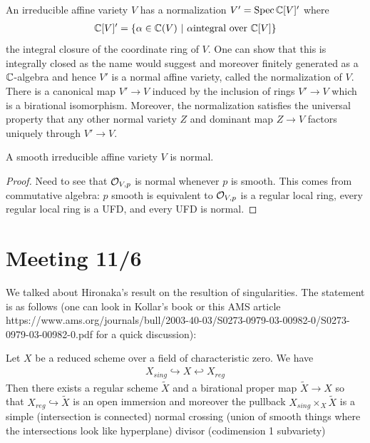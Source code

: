 \documentclass[12pt]{article}
\begin{document}
\begin{fact}
    An irreducible affine variety $V$ has a normalization $V' = \operatorname{Spec}\mathbb{C}[V]'$ where \begin{align*}
        \mathbb{C}[V]' = \{\alpha\in\mathbb{C}(V)\ \vert \ \alpha \text{integral over $\mathbb{C}[V]$}\}
    \end{align*} the integral closure of the coordinate ring of $V$. One can show that this is integrally closed as the name would suggest and moreover finitely generated as a $\mathbb{C}$-algebra and hence $V'$ is a normal affine variety, called the normalization of $V$. There is a canonical map $V'\to V$ induced by the inclusion of rings $V'\to V$ which is a birational isomorphism. Moreover, the normalization satisfies the universal property that any other normal variety $Z$ and dominant map $Z\to V$ factors uniquely through $V'\to V$.
\end{fact}

\begin{proposition}
    A smooth irreducible affine variety $V$ is normal.
\end{proposition}
\begin{proof}
    Need to see that $\mathcal{O}_{V,p}$ is normal whenever $p$ is smooth. This comes from commutative algebra: $p$ smooth is equivalent to $\mathcal{O}_{V,p}$ is a regular local ring, every regular local ring is a UFD, and every UFD is normal.  
\end{proof}

\section{Meeting 11/6}
We talked about Hironaka's result on the resultion of singularities. The statement is as follows (one can look in Kollar's book or this AMS article https://www.ams.org/journals/bull/2003-40-03/S0273-0979-03-00982-0/S0273-0979-03-00982-0.pdf for a quick discussion): 

\begin{theorem}
    Let $X$ be a reduced scheme over a field of characteristic zero. We have \begin{align*}
        X_{sing}\hookrightarrow X \hookleftarrow X_{reg}
    \end{align*} Then there exists a regular scheme $\tilde{X}$ and a birational proper map $\tilde{X}\to X$ so that $X_{reg}\hookrightarrow \tilde{X}$ is an open immersion and moreover the pullback $X_{sing}\times_X \tilde{X}$ is a simple (intersection is connected) normal crossing (union of smooth things where the intersections look like hyperplane) divisor (codimension 1 subvariety)
\end{theorem}
\end{document}
